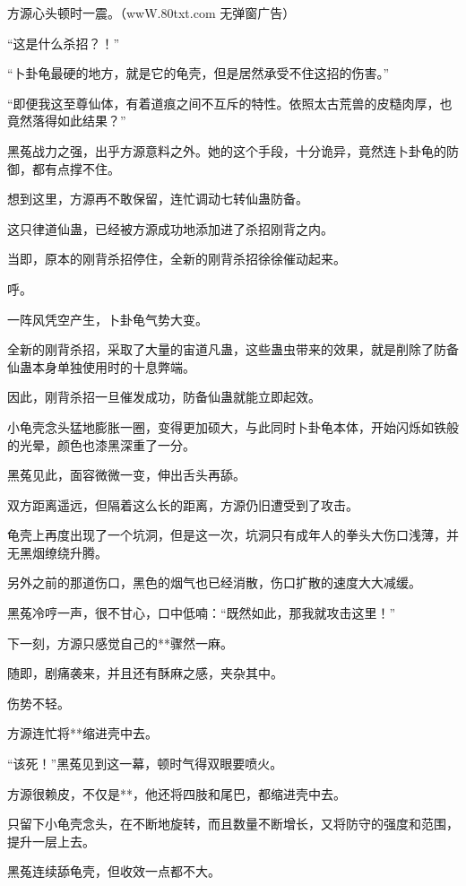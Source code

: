 
\begin{this_body}

方源心头顿时一震。（wwW.80txt.com 无弹窗广告）

“这是什么杀招？！”

“卜卦龟最硬的地方，就是它的龟壳，但是居然承受不住这招的伤害。”

“即便我这至尊仙体，有着道痕之间不互斥的特性。依照太古荒兽的皮糙肉厚，也竟然落得如此结果？”

黑菟战力之强，出乎方源意料之外。她的这个手段，十分诡异，竟然连卜卦龟的防御，都有点撑不住。

想到这里，方源再不敢保留，连忙调动七转仙蛊防备。

这只律道仙蛊，已经被方源成功地添加进了杀招刚背之内。

当即，原本的刚背杀招停住，全新的刚背杀招徐徐催动起来。

呼。

一阵风凭空产生，卜卦龟气势大变。

全新的刚背杀招，采取了大量的宙道凡蛊，这些蛊虫带来的效果，就是削除了防备仙蛊本身单独使用时的十息弊端。

因此，刚背杀招一旦催发成功，防备仙蛊就能立即起效。

小龟壳念头猛地膨胀一圈，变得更加硕大，与此同时卜卦龟本体，开始闪烁如铁般的光晕，颜色也漆黑深重了一分。

黑菟见此，面容微微一变，伸出舌头再舔。

双方距离遥远，但隔着这么长的距离，方源仍旧遭受到了攻击。

龟壳上再度出现了一个坑洞，但是这一次，坑洞只有成年人的拳头大伤口浅薄，并无黑烟缭绕升腾。

另外之前的那道伤口，黑色的烟气也已经消散，伤口扩散的速度大大减缓。

黑菟冷哼一声，很不甘心，口中低喃：“既然如此，那我就攻击这里！”

下一刻，方源只感觉自己的**骤然一麻。

随即，剧痛袭来，并且还有酥麻之感，夹杂其中。

伤势不轻。

方源连忙将**缩进壳中去。

“该死！”黑菟见到这一幕，顿时气得双眼要喷火。

方源很赖皮，不仅是**，他还将四肢和尾巴，都缩进壳中去。

只留下小龟壳念头，在不断地旋转，而且数量不断增长，又将防守的强度和范围，提升一层上去。

黑菟连续舔龟壳，但收效一点都不大。


\end{this_body}
